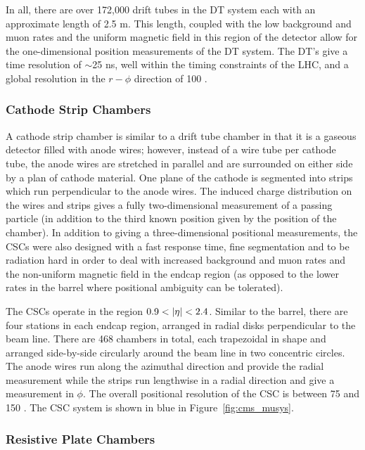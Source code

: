 In all, there are over 172,000 drift tubes in the DT system each with an
approximate length of 2.5 m. This length, coupled with the low background and
muon rates and the uniform magnetic field in this region of the detector allow
for the one-dimensional position measurements of the DT system. The DT's give a
time resolution of $\sim$25 ns, well within the timing constraints of the LHC,
and a global resolution in the $r-\phi$ direction of 100 \um.

\subsubsection{Cathode Strip Chambers}
\label {sec:cms_musys_csc}

A cathode strip chamber is similar to a drift tube chamber in that it is
a gaseous detector filled with anode wires; however, instead of a wire
tube per cathode tube, the anode wires are stretched in parallel and are
surrounded on either side by a plan of cathode material. One plane of the
cathode is segmented into strips which run perpendicular to the anode wires.
The induced charge distribution on the wires and strips gives a fully
two-dimensional measurement of a passing particle (in addition to the third
known position given by the position of the chamber). In addition to giving a
three-dimensional positional measurements, the CSCs were also designed with a
fast response time, fine segmentation and to be radiation hard in order to deal
with increased background and muon rates and the non-uniform magnetic field in
the endcap region (as opposed to the lower rates in the barrel where positional
ambiguity can be tolerated).

The CSCs operate in the \pr region $0.9 < \left|\eta\right| < 2.4$. Similar to the
barrel, there are four stations in each endcap region, arranged in radial
disks perpendicular to the beam line. There are 468 chambers in total, each
trapezoidal in shape and arranged side-by-side circularly around the beam line
in two concentric circles. The anode wires run along the azimuthal direction
and provide the radial measurement while the strips run lengthwise in a radial
direction and give a measurement in $\phi$. The overall positional resolution
of the CSC is between 75 and 150 \um. The CSC system is shown in blue in
Figure~\ref{fig:cms_musys}.

\subsubsection{Resistive Plate Chambers}
\label {sec:cms_musys_rpc}

